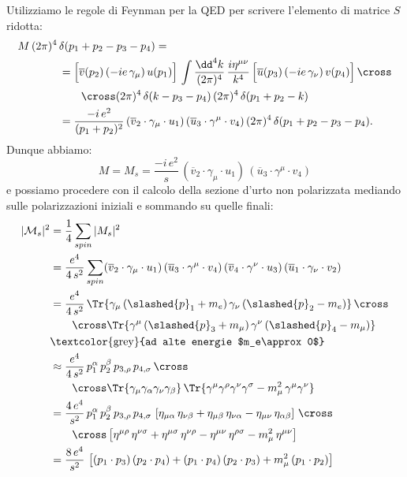 Utilizziamo le regole di Feynman per la QED per scrivere l'elemento di matrice $S$ ridotta:
\begin{align}
    M\, (2\pi)^4\, &\delta(p_1 + p_2 - p_3 - p_4) =\\
    &= \Big[ \overline{v}(p_2)\, (-ie\, \gamma_\mu)\, u(p_1) \Big]\, \int\frac{\dd^4 k}{(2\pi)^4}\, \frac{i\eta^{\mu\nu}}{k^4}\, \Big[ \overline{u}(p_3)\, (-ie\, \gamma_\nu)\, v(p_4) \Big]\, \cross \notag \\
    &\qquad \cross (2\pi)^4\, \delta(k-p_3-p_4)\, (2\pi)^4\, \delta(p_1+p_2-k) \\
    &= \frac{-i\, e^2}{(p_1+p_2)^2}\, (\overline{v}_2\cdot\gamma_\mu\cdot u_1)\, (\overline{u}_3\cdot\gamma^\mu\cdot v_4)\, (2\pi)^4\, \delta(p_1+p_2-p_3-p_4).
\end{align}
Dunque abbiamo:
\begin{equation}
    M = M_s = \frac{-i\, e^2}{s}\, (\overline{v}_2\cdot\gamma_\mu\cdot u_1)\, (\overline{u}_3\cdot\gamma^\mu\cdot v_4)
\end{equation}
e possiamo procedere con il calcolo della sezione d'urto non polarizzata mediando sulle polarizzazioni iniziali e sommando su quelle finali:
\begin{align}
    |\mathcal{M}_s|^2 &= \frac{1}{4}\sum_{spin}|M_s|^2 \\
    &= \frac{e^4}{4\, s^2}\sum_{spin} (\overline{v}_2\cdot\gamma_\mu\cdot u_1)\, (\overline{u}_3\cdot\gamma^\mu\cdot v_4)\, (\overline{v}_4\cdot\gamma^\nu\cdot u_3)\, (\overline{u}_1\cdot\gamma_\nu\cdot v_2) \\
    &= \frac{e^4}{4\, s^2}\, \Tr{ \gamma_\mu\, (\slashed{p}_1 + m_e)\, \gamma_\nu\, (\slashed{p}_2 - m_e) }\, \cross \notag \\
    &\qquad \cross \Tr{ \gamma^\mu\, (\slashed{p}_3 + m_\mu)\, \gamma^\nu\, (\slashed{p}_4 - m_\mu) } \\
    &\text{\textcolor{grey}{ad alte energie $m_e\approx 0$}} \notag \\
    &\approx \frac{e^4}{4\, s^2}\, p_1^\alpha\, p_2^\beta\, p_{3,\rho}\, p_{4,\sigma}\, \cross \notag \\
    &\qquad \cross \Tr{\gamma_\mu\gamma_\alpha\gamma_\nu\gamma_\beta}\, \Tr{\gamma^\mu\gamma^\rho\gamma^\nu\gamma^\sigma - m_\mu^2\, \gamma^\mu\gamma^\nu} \\
    &= \frac{4\, e^4}{s^2}\, p_1^\alpha\, p_2^\beta\, p_{3,\rho}\, p_{4,\sigma}\, \left[\eta_{\mu\alpha}\, \eta_{\nu\beta} + \eta_{\mu\beta}\, \eta_{\nu\alpha} - \eta_{\mu\nu}\, \eta_{\alpha\beta} \right]\, \cross \notag \\
    &\qquad \cross \left[ \eta^{\mu\rho}\, \eta^{\nu\sigma} + \eta^{\mu\sigma}\, \eta^{\nu\rho} - \eta^{\mu\nu}\, \eta^{\rho\sigma} - m_\mu^2\, \eta^{\mu\nu} \right] \\
    &= \frac{8\, e^4}{s^2}\, \left[ (p_1\cdot p_3)\, (p_2\cdot p_4) 
    + (p_1\cdot p_4)\, (p_2\cdot p_3) + m_\mu^2\, (p_1\cdot p_2) \right]
\end{align}
